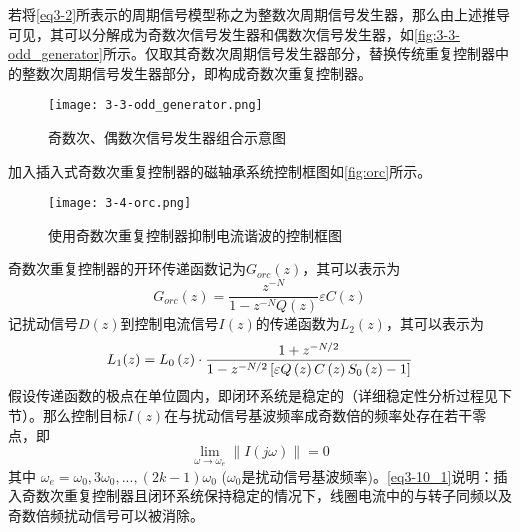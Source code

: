 若将\autoref{eq3-2}所表示的周期信号模型称之为整数次周期信号发生器，那么由上述推导可见，其可以分解成为奇数次信号发生器和偶数次信号发生器，如\autoref{fig:3-3-odd_generator}所示。仅取其奇数次周期信号发生器部分，替换传统重复控制器中的整数次周期信号发生器部分，即构成奇数次重复控制器。
\begin{figure}
	\texttt{[image: 3-3-odd\_generator.png]}
	\caption{奇数次、偶数次信号发生器组合示意图}
	\label{fig:3-3-odd_generator}
\end{figure}
加入插入式奇数次重复控制器的磁轴承系统控制框图如\autoref{fig:orc}所示。
\begin{figure}
	\texttt{[image: 3-4-orc.png]}
	\caption{使用奇数次重复控制器抑制电流谐波的控制框图}
	\label{fig:orc}
\end{figure}
奇数次重复控制器的开环传递函数记为$G_{orc}(z)$，其可以表示为
\begin{equation}
G_{orc}(z)=\dfrac{z^{-N}}{1-z^{-N}Q(z)}\varepsilon C(z)
\end{equation}
记扰动信号$D(z)$到控制电流信号$I(z)$的传递函数为$L_2(z)$，其可以表示为
\begin{equation}
L_1(z)={L_0}\left( z \right) \cdot {{1 + {z^{ - N/2}}} \over {1 - {z^{ - N/2}}\left[ {\varepsilon Q\left( z \right)C\left( z \right){S_0}\left( z \right) - 1} \right]}}
\end{equation}
假设传递函数的极点在单位圆内，即闭环系统是稳定的（详细稳定性分析过程见下节）。那么控制目标$I(z)$在与扰动信号基波频率成奇数倍的频率处存在若干零点，即
\begin{equation}
\label{eq3-10_1}
\mathop {\lim }\limits_{\omega  \to {\omega _e}} \left\| {I\left( {j\omega } \right)} \right\| = 0
\end{equation}
其中 $\omega _e=\omega _0, 3\omega _0,...,(2k-1)\omega _0$ ($\omega _0$是扰动信号基波频率)。\autoref{eq3-10_1}说明：插入奇数次重复控制器且闭环系统保持稳定的情况下，线圈电流中的与转子同频以及奇数倍频扰动信号可以被消除。
